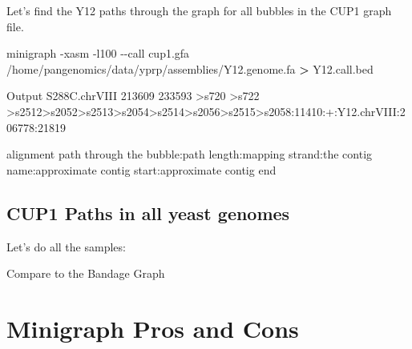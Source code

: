 \documentclass[
]{book}
\newenvironment{Shaded}{\begin{snugshade}}{\end{snugshade}}
\newcommand{\AttributeTok}[1]{\textcolor[rgb]{0.77,0.63,0.00}{#1}}
\newcommand{\ControlFlowTok}[1]{\textcolor[rgb]{0.13,0.29,0.53}{\textbf{#1}}}
\newcommand{\ExtensionTok}[1]{#1}
\newcommand{\FunctionTok}[1]{\textcolor[rgb]{0.00,0.00,0.00}{#1}}
\newcommand{\KeywordTok}[1]{\textcolor[rgb]{0.13,0.29,0.53}{\textbf{#1}}}
\newcommand{\NormalTok}[1]{#1}
\newcommand{\OperatorTok}[1]{\textcolor[rgb]{0.81,0.36,0.00}{\textbf{#1}}}
\newcommand{\PreprocessorTok}[1]{\textcolor[rgb]{0.56,0.35,0.01}{\textit{#1}}}
\newcommand{\VariableTok}[1]{\textcolor[rgb]{0.00,0.00,0.00}{#1}}
\begin{document}
Let's find the Y12 paths through the graph for all bubbles in the CUP1 graph file.

\begin{Shaded}
\begin{Highlighting}[]
\ExtensionTok{minigraph} \AttributeTok{{-}xasm} \AttributeTok{{-}l100} \AttributeTok{{-}{-}call}\NormalTok{ cup1.gfa /home/pangenomics/data/yprp/assemblies/Y12.genome.fa }\OperatorTok{\textgreater{}}\NormalTok{ Y12.call.bed}
\end{Highlighting}
\end{Shaded}

Output
S288C.chrVIII 213609 233593 \textgreater s720 \textgreater s722 \textgreater s2512\textgreater s2052\textgreater s2513\textgreater s2054\textgreater s2514\textgreater s2056\textgreater s2515\textgreater s2058:11410:+:Y12.chrVIII:206778:21819

alignment path through the bubble:path length:mapping strand:the contig name:approximate contig start:approximate contig end

\hypertarget{cup1-paths-in-all-yeast-genomes}{%
\subsection*{CUP1 Paths in all yeast genomes}\label{cup1-paths-in-all-yeast-genomes}}

Let's do all the samples:

\begin{Shaded}
\end{Shaded}

Compare to the Bandage Graph

\hypertarget{minigraph-pros-and-cons}{%
\section{Minigraph Pros and Cons}\label{minigraph-pros-and-cons}}
\end{document}

